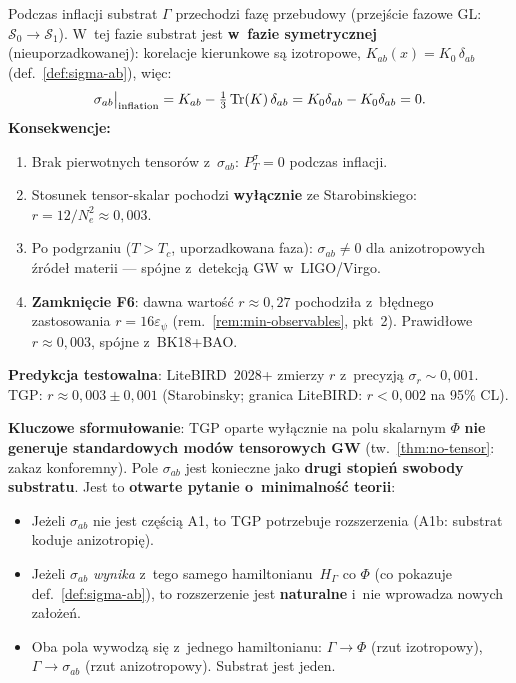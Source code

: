 \begin{remark}[$\sigma_{ab} = 0$ podczas inflacji --- zamkni\k{e}cie F6]%
\label{rem:sigma-inflation}
Podczas inflacji substrat $\Gamma$ przechodzi faz\k{e} przebudowy
(przej\'scie fazowe GL: $\mathcal{S}_0 \to \mathcal{S}_1$).
W~tej fazie substrat jest \textbf{w~fazie symetrycznej} (nieuporzadkowanej):
korelacje kierunkowe s\k{a} izotropowe,
$K_{ab}(x) = K_0\,\delta_{ab}$ (def.~\ref{def:sigma-ab}),
wi\k{e}c:
\begin{equation}\label{eq:sigma-inf-zero}
  \sigma_{ab}\big|_{\rm inflation}
  = K_{ab} - \tfrac{1}{3}\,\mathrm{Tr}(K)\,\delta_{ab}
  = K_0\delta_{ab} - K_0\delta_{ab} = 0.
\end{equation}
\textbf{Konsekwencje:}
\begin{enumerate}[nosep]
  \item Brak pierwotnych tensor\'ow z~$\sigma_{ab}$:
    $P_T^{\sigma} = 0$ podczas inflacji.
  \item Stosunek tensor-skalar pochodzi \textbf{wy\l{}\k{a}cznie}
    ze Starobinskiego: $r = 12/N_e^2 \approx 0{,}003$.
  \item Po podgrzaniu ($T > T_c$, uporzadkowana faza):
    $\sigma_{ab} \neq 0$ dla anizotropowych \'zr\'ode\l{} materii
    --- sp\'ojne z~detekcj\k{a} GW w~LIGO/Virgo.
  \item \textbf{Zamkni\k{e}cie F6}: dawna warto\'s\'c $r \approx 0{,}27$
    pochodzi\l{}a z~b\l{}\k{e}dnego zastosowania $r = 16\varepsilon_\psi$
    (rem.~\ref{rem:min-observables}, pkt~2).
    Prawid\l{}owe $r \approx 0{,}003$, sp\'ojne z~BK18+BAO.
\end{enumerate}
\textbf{Predykcja testowalna}: LiteBIRD~2028+ zmierzy $r$ z~precyzj\k{a}
$\sigma_r \sim 0{,}001$. TGP: $r \approx 0{,}003 \pm 0{,}001$
(Starobinsky; granica LiteBIRD: $r < 0{,}002$ na 95\% CL).
\end{remark}

\begin{remark}\label{rem:sigma-minimality}
\textbf{Kluczowe sformu\l{}owanie}: TGP oparte wy\l{}\k{a}cznie na polu skalarnym
$\Phi$ \textbf{nie generuje standardowych mod\'ow tensorowych GW}
(tw.~\ref{thm:no-tensor}: zakaz konforemny).
Pole $\sigma_{ab}$ jest konieczne jako \textbf{drugi stopie\'n swobody substratu}.
Jest to \textbf{otwarte pytanie o~minimalno\'s\'c teorii}:
\begin{itemize}[nosep]
  \item Je\.zeli $\sigma_{ab}$ nie jest cz\k{e}\'sci\k{a} A1, to TGP
    potrzebuje rozszerzenia (A1b: substrat koduje anizotropi\k{e}).
  \item Je\.zeli $\sigma_{ab}$ \emph{wynika} z~tego samego hamiltonianu~$H_\Gamma$
    co $\Phi$ (co pokazuje def.~\ref{def:sigma-ab}), to rozszerzenie
    jest \textbf{naturalne} i~nie wprowadza nowych za\l{}o\.ze\'n.
  \item Oba pola wywodz\k{a} si\k{e} z~jednego hamiltonianu:
    $\Gamma \to \Phi$ (rzut izotropowy), $\Gamma \to \sigma_{ab}$
    (rzut anizotropowy). Substrat jest jeden.
\end{itemize}
\end{remark}

